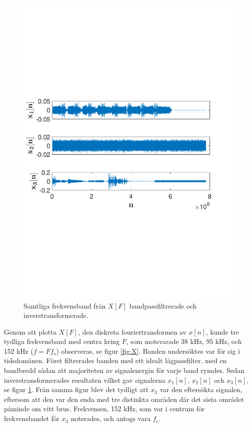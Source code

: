 \documentclass[10pt,twocolumn,a4paper]{article}
\begin{document}
\begin{figure}[width=\textwidth]
    \includegraphics[trim = 0 80mm 0 90mm, clip, width=\linewidth]{fig3.pdf}
    \caption{
        Samtliga frekvensband från $X[F]$ bandpassfiltrerade och inverstransformerade. 
        \label{fig:xt}
    }
\end{figure}

Genom att plotta $X[F]$, den diskreta fouriertransformen av $x[n]$, kunde tre
tydliga frekvensband med centra kring $F$, som motsvarade 38 kHz, 95 kHz, och
152 kHz ($f = F f_s$) observeras, se figur \ref{fig:X}. Banden undersöktes var
för sig i tidsdomänen. Först filtrerades banden med ett idealt lågpassfilter,
med en bandbredd sådan att majoriteten av signalenergin för varje band rymdes.
Sedan inverstransformerades resultaten vilket gav signalerna $x_1[n]$, $x_2[n]$
och $x_3[n]$, se figur \ref{fig:xt}. Från samma figur blev det tydligt att
$x_3$ var den eftersökta signalen, eftersom att den var den enda med tre
distinkta områden där det sista området påminde om vitt brus. Frekvensen, 152
kHz, som var i centrum för frekvensbandet för $x_3$ noterades, och
antogs vara $f_c$. 
\end{document}
